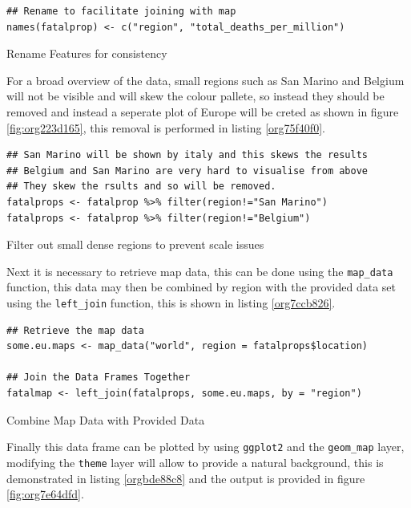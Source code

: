\documentclass[11pt]{article}
\begin{document}
\begin{listing}[htbp]
\begin{verbatim}
## Rename to facilitate joining with map
names(fatalprop) <- c("region", "total_deaths_per_million")
\end{verbatim}
\caption{\label{org70648f3}Rename Features for consistency}
\end{listing}

For a broad overview of the data, small regions such as San Marino and Belgium
will not be visible and will skew the colour pallete, so instead they should be removed
and instead a seperate plot of Europe will be creted as shown in figure \ref{fig:org223d165}, this removal is performed in
listing \ref{org75f40f0}.

\begin{listing}[htbp]
\begin{verbatim}
## San Marino will be shown by italy and this skews the results
## Belgium and San Marino are very hard to visualise from above
## They skew the rsults and so will be removed.
fatalprops <- fatalprop %>% filter(region!="San Marino")
fatalprops <- fatalprop %>% filter(region!="Belgium")
\end{verbatim}
\caption{\label{org75f40f0}Filter out small dense regions to prevent scale issues}
\end{listing}


Next it is necessary to retrieve map data, this can be done using the \texttt{map\_data}
function, this data may then be combined by region with the provided data set
using the \texttt{left\_join} function, this is shown in listing \ref{org7ccb826}.

\begin{listing}[htbp]
\begin{verbatim}
## Retrieve the map data
some.eu.maps <- map_data("world", region = fatalprops$location)

## Join the Data Frames Together
fatalmap <- left_join(fatalprops, some.eu.maps, by = "region")
\end{verbatim}
\caption{\label{org7ccb826}Combine Map Data with Provided Data}
\end{listing}

Finally this data frame can be plotted by using \texttt{ggplot2} and the \texttt{geom\_map}
layer, modifying the \texttt{theme} layer will allow to provide a natural background,
this is demonstrated in listing \ref{orgbde88c8} and the output is provided in figure \ref{fig:org7e64dfd}.
\end{document}
